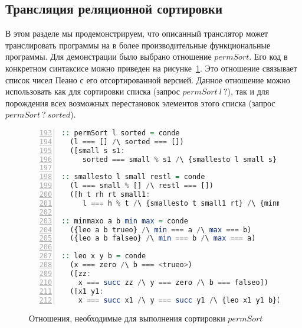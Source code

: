 \subsection{Трансляция реляционной сортировки}
\label{lab:sort}

В этом разделе мы продемонстрируем, что описанный транслятор может транслировать программы на \miniKanren{} в более производительные функциональные программы. 
Для демонстрации было выбрано отношение $permSort$. 
Его код в конкретном синтаксисе \miniKanren{} можно приведен на рисунке~\ref{lst:sort}.
Это отношение связывает список чисел Пеано с его отсортированной версией. 
Данное отношение можно использовать как для сортировки списка (запрос $permSort \ l \ ?$), так и для порождения всех возможных перестановок элементов этого списка (запрос $permSort \ ? \ sorted$). 

\begin{figure}[h!]
  \begin{center}
  \begin{minipage}{0.8\textwidth}
  \begin{lstlisting}[language=Haskell, frame=single, numbers=left,numberstyle=\small, firstnumber=193, escapechar=|]
:: permSort l sorted = conde
  (l === [] /\ sorted === [])
  ([small s s1:
     sorted === small % s1 /\ {smallesto l small s} /\ {permSort s s1}])

:: smallesto l small restl = conde
  (l === small % [] /\ restl === [])
  ([h t rh rt small1:
     l === h % t /\ {smallesto t small1 rt} /\ {minmaxo h small1 small rh} /\ restl === rh % rt])

:: minmaxo a b min max = conde
  ({leo a b trueo} /\ min === a /\ max === b)
  ({leo a b falseo} /\ min === b /\ max === a)

:: leo x y b = conde
  (x === zero /\ b === <trueo>)
  ([zz:
    x === succ zz /\ y === zero /\ b === falseo])
  ([x1 y1:
    x === succ x1 /\ y === succ y1 /\ {leo x1 y1 b})
  \end{lstlisting}
  \end{minipage}
  \end{center}
  \caption{Отношения, необходимые для выполнения сортировки $permSort$}
  \label{lst:sort}
\end{figure}


